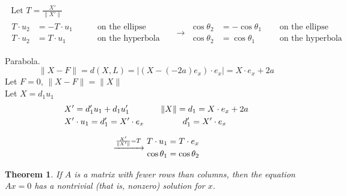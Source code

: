 \documentclass[twoside]{amsart}
\theoremstyle{plain}
\newtheorem{theorem}{Theorem}
\theoremstyle{definition}
\begin{document}
\[
\begin{gathered}
\text{ Let } T = \frac{X'}{ \| X' \| } \\
\begin{aligned}
  T\cdot u_2 & = -T \cdot u_1 \\
  T\cdot u_2 & = T \cdot u_1 
\end{aligned} \quad 
\begin{aligned}
  & \text{ on the ellipse } \quad &   \\
  & \text{ on the hyperbola } \,  &
\end{aligned} \to 
\begin{aligned}
  \cos{ \theta_2} & = -\cos{ \theta_1} \quad & \text{ on the ellipse } \\
  \cos{ \theta_2 } & = \cos{ \theta_1 } \quad & \text{ on the hyperbola } 
\end{aligned}
\end{gathered}
\]

Parabola.  
\[
\| X - F \| = d(X,L) = | (X - (-2a)e_x) \cdot e_x | = X\cdot e_x + 2a 
\]
Let $F=0$, \quad $\| X - F \| = \| X \|$ \\
Let $X = d_1 u_1$
\[
\begin{gathered}
  \begin{aligned}
    & X' = d_1' u_1 + d_1 u_1' \\
    & X'\cdot u_1 = d_1' = X'\cdot e_x
  \end{aligned} \quad \quad 
  \begin{gathered}
    \| X \| = d_1 = X \cdot e_x + 2a \\
    d_1' = X' \cdot e_x 
\end{gathered} \medskip \\
  \xrightarrow{ \frac{ X'}{ \| X' \| } = T } \begin{aligned}
    T\cdot u_1 & = T\cdot e_x \\
    \cos{ \theta_1 } &  = \cos{ \theta_2 }
\end{aligned}
\end{gathered}
\]

\begin{theorem}
If $A$ is a matrix with fewer rows than columns, then the equation $Ax=0$ has a nontrivial (that is, nonzero) solution for $x$.  
\end{theorem}
\end{document}
